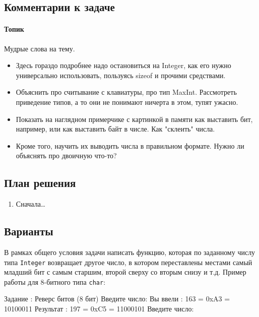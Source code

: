 \subsection*{Комментарии к задаче}

\paragraph{Топик}
Мудрые слова на тему.

\begin{itemize}
    \item Здесь гораздо подробнее надо остановиться на Integer, как его нужно универсально использовать, пользуясь sizeof и прочими средствами. 
    
    \item Объяснить про считывание с клавиатуры, про тип MaxInt. Рассмотреть приведение типов, а то они не понимают ничерта в этом, тупят ужасно.
    \item Показать на наглядном примерчике с картинкой в памяти как выставить бит, например, или как выставить байт в числе. Как "склеить" числа.
    \item Кроме того, научить их выводить числа в правильном формате. Нужно ли объяснять про двоичную что-то?
\end{itemize}

\subsection*{План решения}


\begin{enumerate}
\item Сначала\dots
\end{enumerate}


\subsection*{Варианты}


\begin{zztask}
В рамках общего условия задачи написать функцию, которая по заданному
числу типа \texttt{Integer} возвращает другое число, в котором переставлены местами
самый младший бит с самым старшим, второй сверху со вторым снизу и т.д.
Пример работы для 8-битного типа \texttt{char}:
\begin{zzoutput}
  Задание \thezztask: Реверс битов (8 бит)
  Введите число: 
  Вы ввели  :  163 = 0xA3 = 10100011
  Результат :  197 = 0xC5 = 11000101
  Введите число: \zzuser{ }
\end{zzoutput}
\end{zztask}

